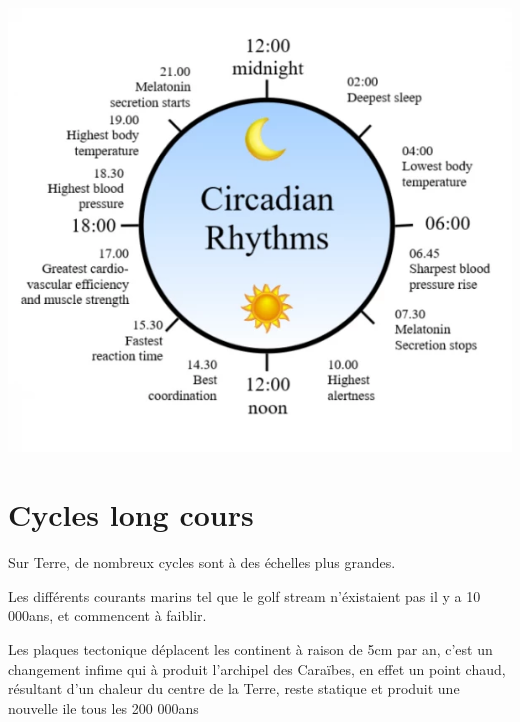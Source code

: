 

\includegraphics[scale=1.00]{media/circadien.png}

\section{Cycles long cours}

Sur Terre, de nombreux cycles sont à des échelles plus grandes.

Les différents courants marins tel que le golf stream n'éxistaient pas il y a 10 000ans, et commencent à faiblir.

Les plaques tectonique déplacent les continent à raison de 5cm par an, c'est un changement infime
qui à produit l'archipel des Caraïbes, en effet un point chaud, résultant d'un chaleur du centre de la Terre,
reste statique et produit une nouvelle ile tous les 200 000ans %

